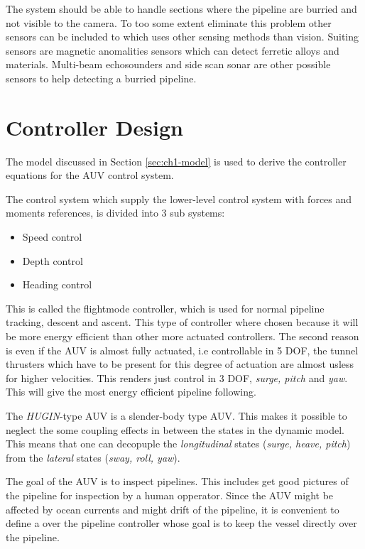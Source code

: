 	The system should be able to handle sections where the pipeline are burried and not visible to the
	camera. To too some extent eliminate this problem other sensors can be included to which uses other
	sensing methods than vision. Suiting sensors are magnetic anomalities sensors which can detect
	ferretic alloys and materials. Multi-beam echosounders and side scan sonar are other possible sensors
	to help detecting a burried pipeline.

\section{Controller Design}
	The model discussed in Section \ref{sec:ch1-model} is used to derive the controller equations for the
	AUV control system.

	The control system which supply the lower-level control system with forces and moments references, is 
	divided into 3 sub systems:
		\begin{itemize}
			\item Speed control
			\item Depth control
			\item Heading control
		\end{itemize}
	This is called the flightmode controller, which is used for normal pipeline tracking, descent and
	ascent. This type of controller where chosen because it will be more energy efficient than other more
	actuated controllers. The second reason is even if the AUV is almost fully actuated, i.e
	controllable in 5 DOF, the tunnel thrusters which have to be present for this degree of actuation are almost
	usless for higher velocities. This renders just control in 3 DOF, \textit{surge, pitch} and
	\textit{yaw}. This will give the most energy efficient pipeline following. 
	
	The \textit{HUGIN}-type AUV is a slender-body type AUV. This makes it possible to neglect the some
	coupling effects in between the states in the dynamic model. This means that one can decopuple the
	\textit{longitudinal} states (\textit{surge, heave, pitch}) from the \textit{lateral} states 
	(\textit{sway, roll, yaw}).

	The goal of the AUV is to inspect pipelines. This includes get good pictures of the pipeline for
	inspection by a human opperator. Since the AUV might be affected by ocean currents and might drift of
	the pipeline, it is convenient to define a over the pipeline controller whose goal is to keep the
	vessel directly over the pipeline. 

